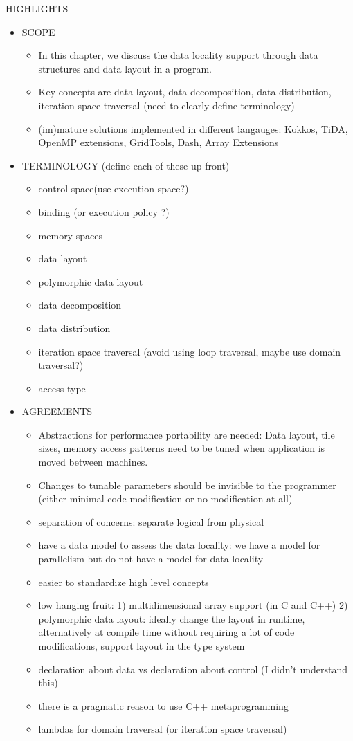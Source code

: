 HIGHLIGHTS
\begin{itemize}
\item SCOPE
  \begin{itemize}
  \item In this chapter, we discuss the data locality support through data structures and data layout in a program. 
  \item Key concepts are data layout, data decomposition, data distribution, iteration space traversal (need to clearly define terminology)
  \item (im)mature solutions implemented in different langauges: Kokkos, TiDA, OpenMP extensions, GridTools, Dash, Array Extensions
  \end{itemize}

\item TERMINOLOGY (define each of these up front)
  \begin{itemize}
  \item control space(use execution space?)
  \item binding  (or execution policy ?)
  \item memory spaces
  \item data layout
  \item polymorphic data layout
  \item data decomposition 
  \item data distribution 
  \item iteration space traversal (avoid using loop traversal, maybe use domain traversal?) 
  \item access type
  \end{itemize}


\item AGREEMENTS
  \begin{itemize}
  \item Abstractions for performance portability are needed: Data layout, tile sizes, memory access patterns need to be tuned when application is moved between machines. 
  \item Changes to tunable parameters should be invisible to the programmer (either minimal code modification or no modification at all)
  \item separation of concerns: separate logical from physical 
  \item have a data model to assess the data locality: we have a model for parallelism but do not have a model for data locality
  \item easier to standardize high level concepts 
  \item low hanging fruit: 
    1) multidimensional array support (in C and C++) 
    2) polymorphic data layout: 
    ideally change the layout in runtime, 
    alternatively at compile time without requiring a lot of code modifications, 
    support layout in the type system 
  \item declaration about data vs declaration about control (I didn't understand this)
  \item there is a pragmatic reason to use C++ metaprogramming
  \item lambdas for domain traversal (or iteration space traversal)
  \end{itemize}
  

\end{itemize}
